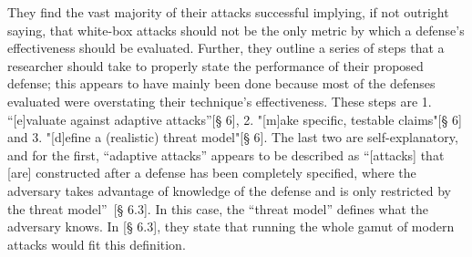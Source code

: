 They find the vast majority of their attacks successful implying, if not outright saying, that
white-box attacks should not be the only metric by which a defense's effectiveness should be
evaluated. Further, they outline a series of steps that a researcher should take to properly state
the performance of their proposed defense; this appears to have mainly been done because most of the
defenses evaluated were overstating their technique's effectiveness. These steps are 1. ``[e]valuate
against adaptive attacks''\cite{athalye2018obfuscated}[§ 6], 2. "[m]ake specific, testable
claims"\cite{athalye2018obfuscated}[§ 6] and 3. "[d]efine a (realistic) threat
model"\cite{athalye2018obfuscated}[§ 6]. The last two are self-explanatory, and for the first,
``adaptive attacks'' appears to be described as ``[attacks] that [are] constructed after a defense
has been completely specified, where the adversary takes advantage of knowledge of the defense and
is only restricted by the threat model''~\cite{athalye2018obfuscated}[§ 6.3]. In this case, the
``threat model'' defines what the adversary knows. In \cite{athalye2018obfuscated}[§ 6.3], they
state that running the whole gamut of modern attacks would fit this definition.